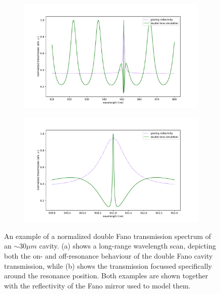 \begin{figure}[h!]
    \centering
    \begin{subfigure}[c]{0.49\textwidth}
        \centering
        \includegraphics[width=\textwidth]{figures/double_fano_full_range_30um.pdf}
        \caption{}
        \label{fig:double_full_range}
    \end{subfigure}
    \begin{subfigure}[c]{0.49\textwidth}
        \includegraphics[width=\textwidth]{figures/double_fano_short_range_30um.pdf}
        \caption{}
        \label{fig:double_short_range}
    \end{subfigure}
    \caption{An example of a normalized double Fano transmission spectrum of an $\sim 30 \mu m$ cavity. (a) shows a long-range wavelength scan, depicting both the on- and off-resonance behaviour of the double Fano cavity transmission, while (b) shows the transmission focussed specifically around the resonance position. Both examples are shown together with the reflectivity of the Fano mirror used to model them.}
    \label{fig:double_fano_transmission}
\end{figure}

